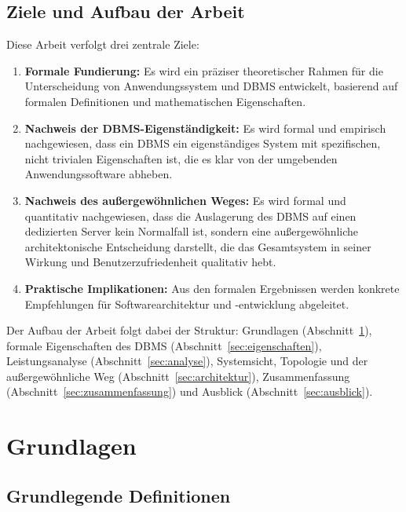 ﻿\documentclass[a4paper,12pt]{article}
\theoremstyle{definition}
\begin{document}
\subsection{Ziele und Aufbau der Arbeit}

Diese Arbeit verfolgt drei zentrale Ziele:

\begin{enumerate}
	\item \textbf{Formale Fundierung:} Es wird ein präziser theoretischer Rahmen für die Unterscheidung von Anwendungssystem und DBMS entwickelt, basierend auf formalen Definitionen und mathematischen Eigenschaften.
	\item \textbf{Nachweis der DBMS-Eigenständigkeit:} Es wird formal und empirisch nachgewiesen, dass ein DBMS ein eigenständiges System mit spezifischen, nicht trivialen Eigenschaften ist, die es klar von der umgebenden Anwendungssoftware abheben.
	\item \textbf{Nachweis des außergewöhnlichen Weges:} Es wird formal und quantitativ nachgewiesen, dass die Auslagerung des DBMS auf einen dedizierten Server kein Normalfall ist, sondern eine außergewöhnliche architektonische Entscheidung darstellt, die das Gesamtsystem in seiner Wirkung und Benutzerzufriedenheit qualitativ hebt.
\item \textbf{Praktische Implikationen:} Aus den formalen Ergebnissen werden konkrete Empfehlungen für Softwarearchitektur und -entwicklung abgeleitet.
\end{enumerate}

Der Aufbau der Arbeit folgt dabei der Struktur: Grundlagen (Abschnitt~\ref{sec:grundlagen}), formale Eigenschaften des DBMS (Abschnitt~\ref{sec:eigenschaften}), Leistungsanalyse (Abschnitt~\ref{sec:analyse}), Systemsicht, Topologie und der außergewöhnliche Weg (Abschnitt~\ref{sec:architektur}), Zusammenfassung (Abschnitt~\ref{sec:zusammenfassung}) und Ausblick (Abschnitt~\ref{sec:ausblick}).

\section{Grundlagen}
\label{sec:grundlagen}

\subsection{Grundlegende Definitionen}
\end{document}
